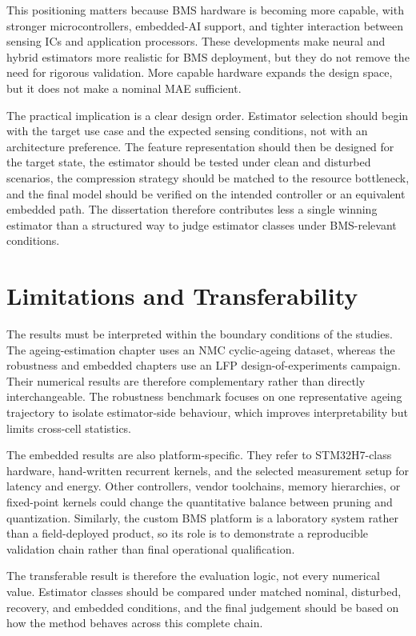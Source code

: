 \documentclass[
    a4paper,
    12pt,
    titlepage,
    bibliography=totoc,
    twoside=on,
    parskip=false,
    numbers=noenddot,
    cleardoublepage=empty,
    DIV=12,
    BCOR=12.0mm,
    headheight=36pt,
    headings=openright
]{scrreprt}
\begin{document}
This positioning matters because BMS hardware is becoming more capable, with stronger microcontrollers, embedded-AI support, and tighter interaction between sensing ICs and application processors. These developments make neural and hybrid estimators more realistic for BMS deployment, but they do not remove the need for rigorous validation. More capable hardware expands the design space, but it does not make a nominal MAE sufficient.

The practical implication is a clear design order. Estimator selection should begin with the target use case and the expected sensing conditions, not with an architecture preference. The feature representation should then be designed for the target state, the estimator should be tested under clean and disturbed scenarios, the compression strategy should be matched to the resource bottleneck, and the final model should be verified on the intended controller or an equivalent embedded path. The dissertation therefore contributes less a single winning estimator than a structured way to judge estimator classes under BMS-relevant conditions.

\section{Limitations and Transferability}
The results must be interpreted within the boundary conditions of the studies. The ageing-estimation chapter uses an NMC cyclic-ageing dataset, whereas the robustness and embedded chapters use an LFP design-of-experiments campaign. Their numerical results are therefore complementary rather than directly interchangeable. The robustness benchmark focuses on one representative ageing trajectory to isolate estimator-side behaviour, which improves interpretability but limits cross-cell statistics.

The embedded results are also platform-specific. They refer to STM32H7-class hardware, hand-written recurrent kernels, and the selected measurement setup for latency and energy. Other controllers, vendor toolchains, memory hierarchies, or fixed-point kernels could change the quantitative balance between pruning and quantization. Similarly, the custom BMS platform is a laboratory system rather than a field-deployed product, so its role is to demonstrate a reproducible validation chain rather than final operational qualification.

The transferable result is therefore the evaluation logic, not every numerical value. Estimator classes should be compared under matched nominal, disturbed, recovery, and embedded conditions, and the final judgement should be based on how the method behaves across this complete chain.
\end{document}
